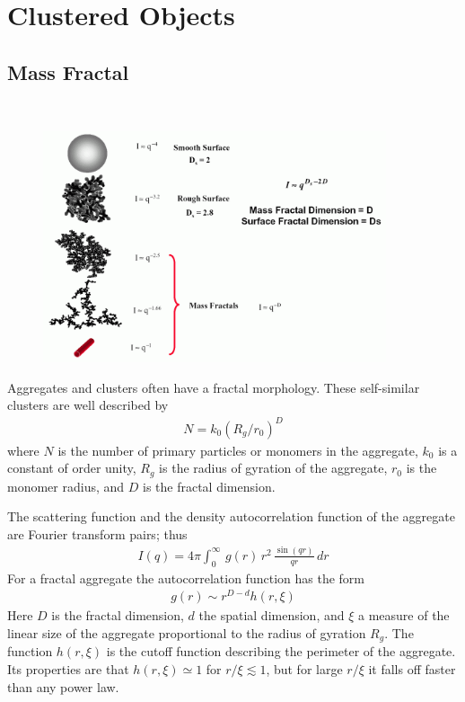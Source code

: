 \clearpage
\section{Clustered Objects}
\label{sect:ClusteredObjects}

\subsection{Mass Fractal
\cite{Sorensen1999,Sorensen1992,Hurd1988,Lin1989,Lin1990,Lin1990a,Lin1990b}}
\label{sect:MassFractal}
\hspace{1pt} \\

\begin{figure}[htb]
\begin{center}
\includegraphics[width=0.9\textwidth]{../images/form_factor/cluster/fractaldimension.png}
\end{center}
\caption{} \label{fractaldimension}
\end{figure}

Aggregates and clusters often have a fractal morphology. These self-similar clusters are well
described by
\begin{align}
N=k_0(R_g/r_0)^D
\end{align}
where $N$ is the number of primary particles or monomers in the aggregate,
$k_0$ is a constant of order unity, $R_g$ is the radius of gyration of the aggregate,
$r_0$ is the monomer radius, and $D$ is the fractal dimension.

The scattering function and the density autocorrelation function
of the aggregate are Fourier transform pairs; thus
\begin{align}
I(q)=4\pi \int_0^\infty \, g(r)\, r^2\, \frac{\sin(qr)}{qr}\, dr
\label{eq:aggregateSQ}
\end{align}
For a fractal aggregate the autocorrelation function has the
form
\begin{align}
g(r) \sim r^{D-d} h(r,\xi)
\label{eq:aggregate_g(r)}
\end{align}
Here $D$ is the fractal dimension, $d$ the spatial dimension, and
$\xi$ a measure of the linear size of the aggregate proportional to
the radius of gyration $R_g$. The function $h(r,\xi)$ is the cutoff
function describing the perimeter of the aggregate. Its properties
are that $h(r,\xi) \simeq 1$ for $r/\xi \lesssim 1$, but for large
$r/\xi$ it falls off faster than any power law.

